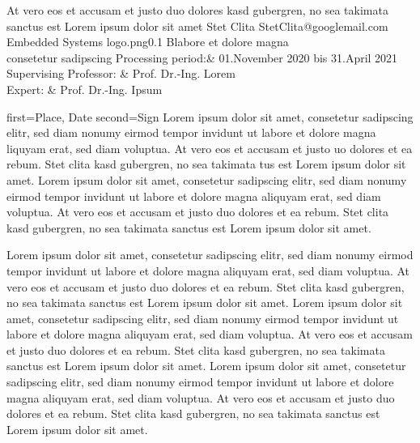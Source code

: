 \documentclass[]{../thesis}
\begin{document}
	\startintro

	\begin{titlepage}
		{At vero eos et accusam et justo duo dolores kasd gubergren, no sea takimata sanctus est 
	Lorem ipsum dolor sit amet}
		{Stet Clita}
		{StetClita@googlemail.com}
		{Embedded Systems}
		{logo.png}{0.1}
		{Blabore et dolore magna \\ consetetur sadipscing}
        {Processing period:& 01.November 2020 bis 31.April 2021\\
		            Supervising Professor: & Prof. Dr.-Ing. Lorem\\
		            Expert: & Prof. Dr.-Ing. Ipsum\\}

	\end{titlepage}

	\begin{proclamation}{first={Place, Date}}
		{second={Sign}}
     Lorem ipsum dolor sit amet, consetetur sadipscing elitr, sed 
     diam nonumy eirmod tempor invidunt ut labore et dolore magna 
     liquyam erat, sed diam voluptua. At vero eos et accusam et 
     justo 
     uo dolores et ea rebum. Stet clita kasd gubergren, no sea 
     takimata 
    tus est Lorem ipsum dolor sit amet. Lorem ipsum dolor sit 		
    amet, consetetur sadipscing elitr, sed diam nonumy eirmod 
    tempor invidunt ut labore et dolore magna aliquyam erat, sed diam 
	voluptua. At vero eos et accusam et justo duo dolores et ea 	
	rebum. Stet clita kasd gubergren, no sea takimata sanctus est 
	Lorem ipsum dolor sit amet.
	\end{proclamation}
	

	Lorem ipsum dolor sit amet, consetetur sadipscing elitr, sed
	diam nonumy eirmod tempor invidunt ut labore et dolore magna 
	aliquyam erat, sed diam voluptua. At vero eos et accusam et 
	justo duo dolores et ea rebum. Stet clita kasd gubergren, no 
	sea takimata sanctus est Lorem ipsum dolor sit amet. Lorem 
	ipsum dolor sit amet, consetetur sadipscing elitr, sed diam 
	nonumy eirmod tempor invidunt ut labore et dolore magna 
	aliquyam erat, sed diam voluptua. At vero eos et accusam et 
	justo duo dolores et ea rebum. Stet clita kasd gubergren, no 
	sea takimata sanctus est Lorem ipsum dolor sit amet. Lorem 
	ipsum dolor sit amet, consetetur sadipscing elitr, sed diam 
	nonumy eirmod tempor invidunt ut labore et dolore magna 
	aliquyam erat, sed diam voluptua. At vero eos et accusam et 
	justo duo dolores et ea rebum. Stet clita kasd gubergren, no 
	sea takimata sanctus est Lorem ipsum dolor sit amet.		
	\newpage
	
\end{document}
